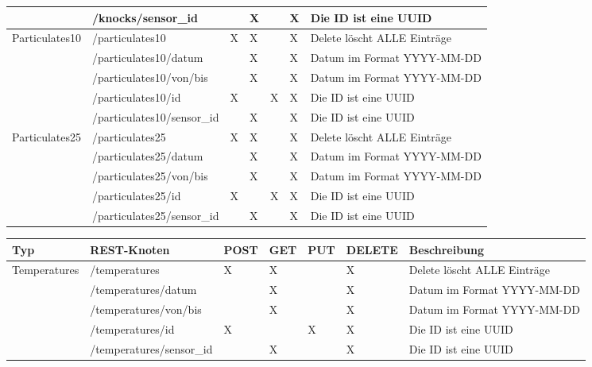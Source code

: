 \begin{landscape}
\begin{table}[H]
\begin{longtable}{lllllll}
                                      & /knocks/{sensor\_id}          &  & X & & X & Die ID ist eine UUID           \\ \midrule
      \multirow{5}{*}{Particulates10} & /particulates10               & X & X & & X & Delete löscht ALLE Einträge   \\
                                      & /particulates10/{datum}       &  & X & & X & Datum im Format YYYY-MM-DD     \\
                                      & /particulates10/{von}/{bis}   &  & X & & X & Datum im Format YYYY-MM-DD     \\
                                      & /particulates10/{id}          & X & & X & X & Die ID ist eine UUID          \\
                                      & /particulates10/{sensor\_id}  &  & X & & X & Die ID ist eine UUID           \\ \midrule
      \multirow{5}{*}{Particulates25} & /particulates25               & X & X & & X & Delete löscht ALLE Einträge   \\
                                      & /particulates25/{datum}       &  & X & & X & Datum im Format YYYY-MM-DD     \\
                                      & /particulates25/{von}/{bis}   &  & X & & X & Datum im Format YYYY-MM-DD     \\
                                      & /particulates25/{id}          & X & & X & X & Die ID ist eine UUID          \\
                                      & /particulates25/{sensor\_id}  &  & X & & X & Die ID ist eine UUID           \\ \midrule
    \end{longtable}
  \end{table}

  \newpage

  \begin{table}[H]
    \begin{longtable}{lllllll}
      \textbf{Typ} & \textbf{REST-Knoten} & \textbf{POST} & \textbf{GET} & \textbf{PUT} & \textbf{DELETE} & \textbf{Beschreibung} \\ \toprule
      \multirow{5}{*}{Temperatures}   & /temperatures                 & X & X & & X & Delete löscht ALLE Einträge   \\
                                      & /temperatures/{datum}         &  & X & & X & Datum im Format YYYY-MM-DD     \\
                                      & /temperatures/{von}/{bis}     &  & X & & X & Datum im Format YYYY-MM-DD     \\
                                      & /temperatures/{id}            & X & & X & X & Die ID ist eine UUID          \\
                                      & /temperatures/{sensor\_id}    &  & X & & X & Die ID ist eine UUID           \\ \midrule


\end{longtable}
\end{table}
\end{landscape}
